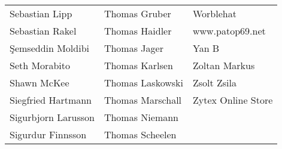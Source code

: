 \begin{small}
\begin{tabular}{p{4cm}p{4cm}p{4cm}}
Sebastian Lipp & Thomas Gruber & Worblehat \\
Sebastian Rakel & Thomas Haidler & www.patop69.net \\
Şemseddin Moldibi & Thomas Jager & Yan B \\
Seth Morabito & Thomas Karlsen & Zoltan Markus \\
Shawn McKee & Thomas Laskowski & Zsolt Zsila \\
Siegfried Hartmann & Thomas Marschall & Zytex Online Store \\
Sigurbjorn Larusson & Thomas Niemann &  \\
Sigurdur Finnsson & Thomas Scheelen &  \\
\end{tabular}
\end{small}
\ifdefined\printmanual
\else
{}
\fi

